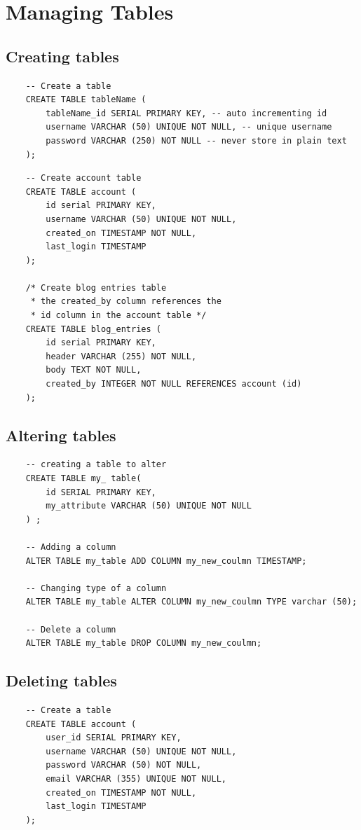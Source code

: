 \section{Managing Tables}

\subsection{Creating tables}
\begin{verbatim}
    -- Create a table
    CREATE TABLE tableName (
        tableName_id SERIAL PRIMARY KEY, -- auto incrementing id
        username VARCHAR (50) UNIQUE NOT NULL, -- unique username
        password VARCHAR (250) NOT NULL -- never store in plain text
    );
\end{verbatim}

\begin{verbatim}
    -- Create account table
    CREATE TABLE account (
        id serial PRIMARY KEY,
        username VARCHAR (50) UNIQUE NOT NULL,
        created_on TIMESTAMP NOT NULL, 
        last_login TIMESTAMP
    );
    
    /* Create blog entries table
     * the created_by column references the 
     * id column in the account table */
    CREATE TABLE blog_entries (
        id serial PRIMARY KEY, 
        header VARCHAR (255) NOT NULL,
        body TEXT NOT NULL,
        created_by INTEGER NOT NULL REFERENCES account (id)
    );
\end{verbatim}

\subsection{Altering tables}
\begin{verbatim}
    -- creating a table to alter
    CREATE TABLE my_ table( 
        id SERIAL PRIMARY KEY, 
        my_attribute VARCHAR (50) UNIQUE NOT NULL
    ) ;
    
    -- Adding a column
    ALTER TABLE my_table ADD COLUMN my_new_coulmn TIMESTAMP;
    
    -- Changing type of a column
    ALTER TABLE my_table ALTER COLUMN my_new_coulmn TYPE varchar (50);

    -- Delete a column
    ALTER TABLE my_table DROP COLUMN my_new_coulmn;

\end{verbatim}

\subsection{Deleting tables}
\begin{verbatim}
    -- Create a table
    CREATE TABLE account (
        user_id SERIAL PRIMARY KEY,
        username VARCHAR (50) UNIQUE NOT NULL,
        password VARCHAR (50) NOT NULL,
        email VARCHAR (355) UNIQUE NOT NULL,
        created_on TIMESTAMP NOT NULL,
        last_login TIMESTAMP
    );
\end{verbatim}

